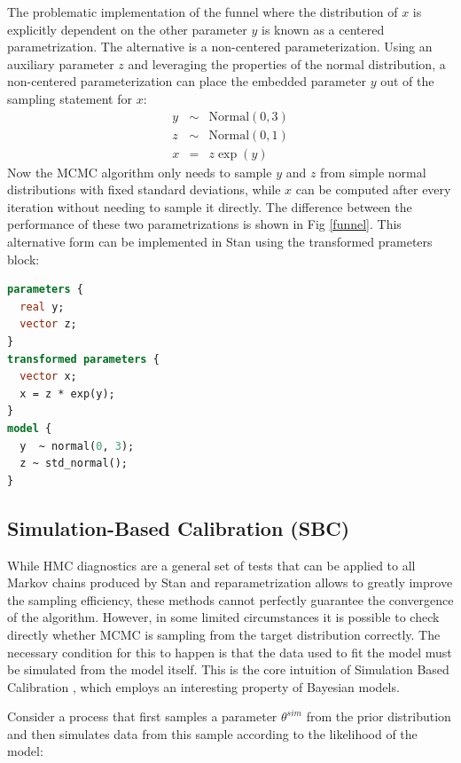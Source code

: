 The problematic implementation of the funnel where the distribution of $x$ is explicitly dependent on the other
parameter $y$ is known as a centered parametrization.
The alternative is a non-centered parameterization. Using an auxiliary parameter $z$ and leveraging the properties of the normal distribution, a non-centered
parameterization can place the embedded parameter $y$ out of the sampling statement for $x$:
\begin{eqnarray}
  y&\sim&\mathrm{Normal}(0,3)\\
  z&\sim&\mathrm{Normal}(0,1)\\
  x&=&z\exp(y)
\end{eqnarray}
Now the MCMC algorithm only needs to sample $y$ and $z$ from simple normal distributions with fixed standard deviations,
while $x$ can be computed after every iteration without needing to sample it directly.
The difference between the performance of these two parametrizations is shown in Fig \ref{funnel}.
This alternative form can be implemented in Stan using the transformed prameters block:

\begin{lstlisting}[language=Stan]
parameters {
  real y;
  vector z;
}
transformed parameters {
  vector x;
  x = z * exp(y);
}
model {
  y  ~ normal(0, 3);
  z ~ std_normal();
}
\end{lstlisting}




\subsection{Simulation-Based Calibration (SBC)}
While HMC diagnostics are a general set of tests that can be applied to all Markov chains produced by Stan and
reparametrization allows to greatly improve the sampling efficiency, these methods cannot perfectly guarantee the convergence of the algorithm. 
However, in some limited circumstances it is possible to check directly whether MCMC is sampling from the target distribution correctly.
The necessary condition for this to happen is that the data used to fit the model must be simulated from the model
itself. This is the core intuition of Simulation Based Calibration  \cite{talts2018validating}, which employs an interesting property of Bayesian models. 

Consider a process that first samples a parameter $\theta^{sim}$ from the prior distribution and then simulates data from this sample according to the likelihood of the model:


